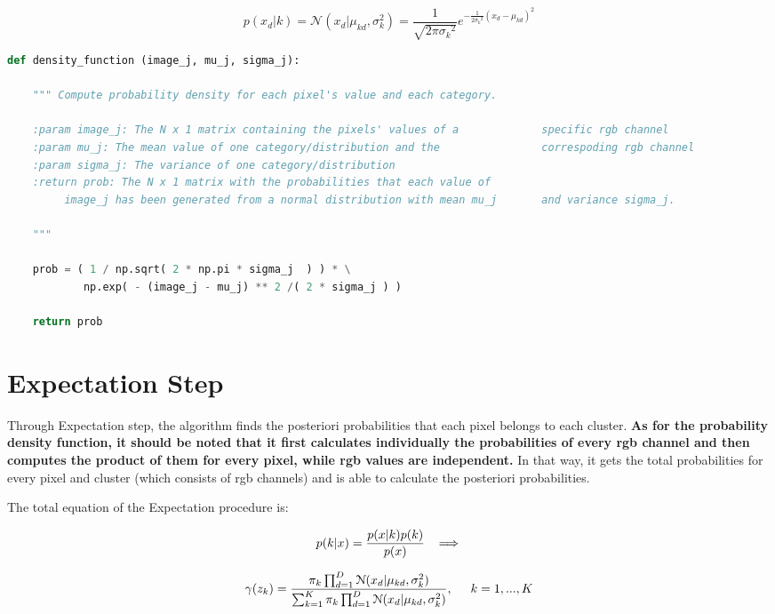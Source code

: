 \documentclass[11pt]{article}
\begin{document}
$$
{p(x_d|k)}= \mathcal{N} (x_d|\mu_{kd}, \sigma_{k}^2) = \frac{1}{\sqrt{2\pi{\sigma_{k}}^2}}e^{-\frac{1}{2{σ_{k}}^2}{(x_d-μ_{kd})}^2}$$

\begin{lstlisting}[language = Python]
def density_function (image_j, mu_j, sigma_j):
    
    """ Compute probability density for each pixel's value and each category.
    
    :param image_j: The N x 1 matrix containing the pixels' values of a             specific rgb channel
    :param mu_j: The mean value of one category/distribution and the                correspoding rgb channel
    :param sigma_j: The variance of one category/distribution
    :return prob: The N x 1 matrix with the probabilities that each value of 
         image_j has been generated from a normal distribution with mean mu_j       and variance sigma_j.
        
    """
    
    prob = ( 1 / np.sqrt( 2 * np.pi * sigma_j  ) ) * \
            np.exp( - (image_j - mu_j) ** 2 /( 2 * sigma_j ) )

    return prob
\end{lstlisting}
\newpage
\section{Expectation Step}

Through Expectation step, the algorithm finds the posteriori probabilities that each pixel belongs to each cluster.\textbf{ As for the probability density function, it should be noted that it first calculates individually the probabilities of every rgb channel and then computes the product of them for every pixel, while rgb values are independent.} In that way, it gets the total probabilities for every pixel and cluster (which consists of rgb channels) and is able to calculate the posteriori probabilities. 
\newline

\noindent The total equation of the Expectation procedure is:

$$
p(k|x) =\frac{ p(x|k) p(k)}{p(x)} \hspace{0.3cm} \Longrightarrow \\
$$

$$
\gamma{(z_k)} = \frac{\pi_{k} \prod_{d=1}^{D} \mathcal{N} (x_{d}|\mu_{kd}, \sigma_{k}^2)} {\sum_{k=1}^{K} \pi_k \prod_{d=1}^{D} \mathcal{N} (x_{d}|\mu_{kd}, \sigma_{k}^2)},  \hspace{5mm} k=1,...,K
$$
\newline 
\end{document}
